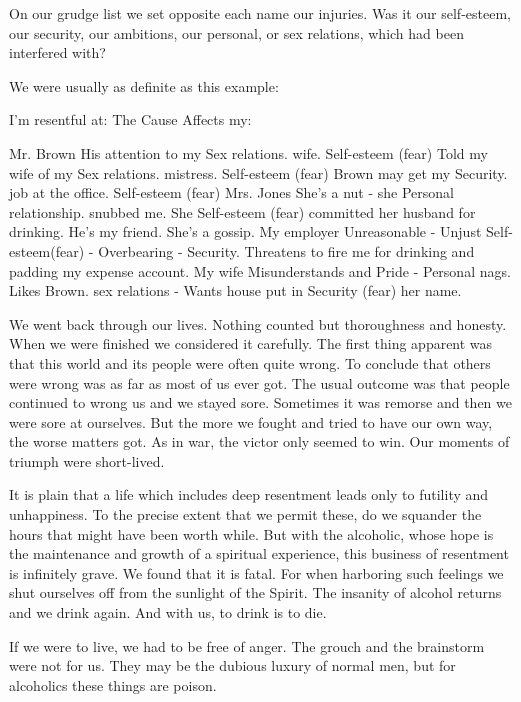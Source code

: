 \begin{biblechapter}
On our grudge list we set opposite each name our  injuries.  Was it our self-esteem, our security, our ambitions, our personal, or sex relations, which had been  interfered with?

We were usually as definite as this example:

I'm resentful at:            The Cause                                    Affects my:

Mr. Brown 	His attention to my 	Sex relations.
 		wife. 	Self-esteem (fear) 
 	Told my wife of my 	Sex relations.
 		mistress. 	Self-esteem (fear)
 	Brown may get my  	Security.
 		job at the office. 	Self-esteem (fear)
Mrs. Jones 	She's a nut - she 	Personal relationship.
 		snubbed me. She 	Self-esteem (fear)
 		committed her husband 	
 		for drinking.
 		He's my friend.
 		She's a gossip.
My employer 	Unreasonable - Unjust 	Self-esteem(fear)
 		- Overbearing - 	Security.
 		Threatens to fire
 		me for drinking
 		and padding my expense
 		account.
My wife 	Misunderstands and 	Pride - Personal
 		nags. Likes Brown. 	sex  relations -
 		Wants house put in 	Security (fear)
 		her name.

We went back through our lives.  Nothing counted but thoroughness and honesty.  When we were finished we considered it carefully.  The first thing apparent was that this world and its people were often quite wrong.  To conclude that others were wrong was as far as most of us ever got.  The usual outcome was that people continued to wrong us and we stayed sore.  Sometimes it was remorse and then we were sore at ourselves.  But the more we fought and tried to have our own way, the worse matters got.  As in war, the victor only seemed to win.  Our moments of triumph were short-lived.

It is plain that a life which includes deep resentment leads only to futility and unhappiness.  To the precise extent that we permit these, do we squander the hours that might have been worth while.  But with the alcoholic, whose hope is the maintenance and growth of a spiritual experience, this business of resentment is infinitely grave.  We found that it is fatal.  For when harboring such feelings we shut ourselves off from the sunlight of the Spirit.  The insanity of alcohol returns and we drink again.  And with us, to drink is to die.

If we were to live, we had to be free of anger.  The grouch and the brainstorm were not for us.  They may be the dubious luxury of normal men, but for alcoholics these things are poison.


\end{biblechapter}
